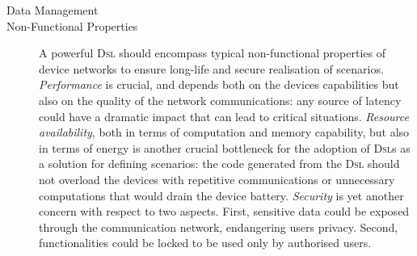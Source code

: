 \begin{description}
	\item[Data Management]  
	
	\item[Non-Functional Properties] A powerful \textsc{Dsl} should encompass typical non-functional properties of device networks to ensure long-life and secure realisation of scenarios. \emph{Performance} is crucial, and depends both on the devices capabilities but also on the quality of the network communications: any source of latency could have a dramatic impact that can lead to critical situations. \emph{Resource availability}, both in terms of computation and memory capability, but also in terms of energy is another crucial bottleneck for the adoption of \textsc{Dsl}s as a solution for defining scenarios: the code generated from the \textsc{Dsl} should not overload the devices with repetitive communications or unnecessary computations that would drain the device battery. \emph{Security} is yet another concern with respect to two aspects. First, sensitive data could be exposed through the communication network, endangering users privacy. Second, functionalities could be locked to be used only by authorised users.

\end{description}


